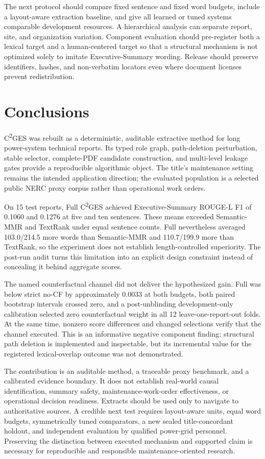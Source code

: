 \documentclass[applsci,article,submit,moreauthors]{Definitions/mdpi}
\newcommand{\cges}{C\textsuperscript{2}GES}
\begin{document}
The next protocol should compare fixed sentence and fixed word budgets, include a layout-aware extraction baseline, and give all learned or tuned systems comparable development resources. A hierarchical analysis can separate report, site, and organization variation. Component evaluation should pre-register both a lexical target and a human-centered target so that a structural mechanism is not optimized solely to imitate Executive-Summary wording. Release should preserve identifiers, hashes, and non-verbatim locators even where document licenses prevent redistribution.

\section{Conclusions}

\cges{} was rebuilt as a deterministic, auditable extractive method for long power-system technical reports. Its typed role graph, path-deletion perturbation, stable selector, complete-PDF candidate construction, and multi-level leakage gates provide a reproducible algorithmic object. The title's maintenance setting remains the intended application direction; the evaluated population is a selected public NERC proxy corpus rather than operational work orders.

On 15 test reports, Full \cges{} achieved Executive-Summary ROUGE-L F1 of 0.1060 and 0.1276 at five and ten sentences. These means exceeded Semantic-MMR and TextRank under equal sentence counts. Full nevertheless averaged 103.0/214.5 more words than Semantic-MMR and 110.7/199.9 more than TextRank, so the experiment does not establish length-controlled superiority. The post-run audit turns this limitation into an explicit design constraint instead of concealing it behind aggregate scores.

The named counterfactual channel did not deliver the hypothesized gain. Full was below strict no-CF by approximately 0.0033 at both budgets, both paired bootstrap intervals crossed zero, and a post-unblinding development-only calibration selected zero counterfactual weight in all 12 leave-one-report-out folds. At the same time, nonzero score differences and changed selections verify that the channel executed. This is an informative negative component finding: structural path deletion is implemented and inspectable, but its incremental value for the registered lexical-overlap outcome was not demonstrated.

The contribution is an auditable method, a traceable proxy benchmark, and a calibrated evidence boundary. It does not establish real-world causal identification, summary safety, maintenance-work-order effectiveness, or operational decision readiness. Extracts should be used only to navigate to authoritative sources. A credible next test requires layout-aware units, equal word budgets, symmetrically tuned comparators, a new sealed title-concordant holdout, and independent evaluation by qualified power-grid personnel. Preserving the distinction between executed mechanism and supported claim is necessary for reproducible and responsible maintenance-oriented research.
\end{document}
